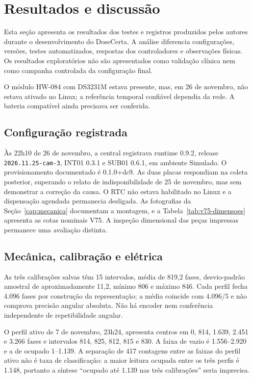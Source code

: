 \chapter{Resultados e discussão}\label{cap:resultados}
Esta seção apresenta os resultados dos testes e registros produzidos pelos autores durante o desenvolvimento do DoseCerta. A análise diferencia configurações, versões, testes automatizados, respostas dos controladores e observações físicas. Os resultados exploratórios não são apresentados como validação clínica nem como campanha controlada da configuração final.

O módulo HW-084 com DS3231M estava presente, mas, em 26 de novembro, não estava ativado no Linux; a referência temporal confiável dependia da rede. A bateria compatível ainda precisava ser conferida.

\section{Configuração registrada}
Às 22h10 de 26 de novembro, a central registrava runtime 0.9.2, release \texttt{2026.11.25-cam-3}, INT01 0.3.1 e SUB01 0.6.1, em ambiente Simulado. O provisionamento documentado é 0.1.0+dc9. As duas placas respondiam na coleta posterior, superando o relato de indisponibilidade de 25 de novembro, mas sem demonstrar a correção da causa. O RTC não estava habilitado no Linux e a dispensação agendada permanecia desligada. As fotografias da Seção~\ref{cap:mecanica} documentam a montagem, e a Tabela~\ref{tab:v75-dimensoes} apresenta as cotas nominais V75. A inspeção dimensional das peças impressas permanece uma avaliação distinta. 

\section{Mecânica, calibração e elétrica}
As três calibrações salvas têm 15 intervalos, média de 819,2 fases, desvio-padrão amostral de aproximadamente 11,2, mínimo 806 e máximo 846. Cada perfil fecha 4.096 fases por construção da representação; a média coincide com $4.096/5$ e não comprova precisão angular absoluta. Não há encoder nem conferência independente de repetibilidade angular. 

O perfil ativo de 7 de novembro, 23h24, apresenta centros em 0, 814, 1.639, 2.451 e 3.266 fases e intervalos 814, 825, 812, 815 e 830. A faixa de vazio é 1.556--2.920 e a de ocupado 1--1.139. A separação de 417 contagens entre as faixas do perfil ativo não é taxa de classificação: a maior leitura ocupada entre os três perfis é 1.148, portanto a síntese ``ocupado até 1.139 nas três calibrações'' seria imprecisa. 


